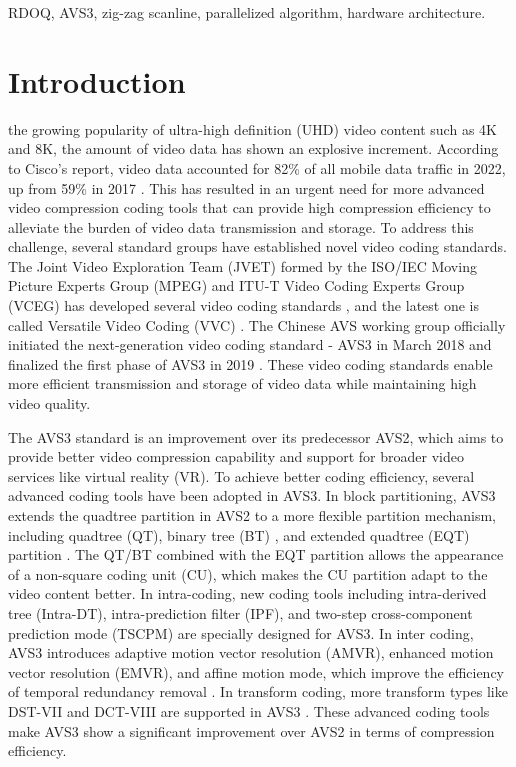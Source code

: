 \documentclass[lettersize,journal]{IEEEtran}
\begin{document}
\begin{IEEEkeywords}
	RDOQ, AVS3, zig-zag scanline, parallelized algorithm, hardware architecture.
\end{IEEEkeywords}

\section{Introduction}
\label{sec:1}
 the growing popularity of ultra-high definition (UHD) video content such as 4K and 8K, the amount of video data has shown an explosive increment. According to Cisco's report, video data accounted for 82\% of all mobile data traffic in 2022, up from 59\% in 2017 \cite{barnett2018cisco}. This has resulted in an urgent need for more advanced video compression coding tools that can provide high compression efficiency to alleviate the burden of video data transmission and storage. To address this challenge, several standard groups have established novel video coding standards. The Joint Video Exploration Team (JVET) formed by the ISO/IEC Moving Picture Experts Group (MPEG) and ITU-T Video Coding Experts Group (VCEG) has developed several video coding standards \cite{1994H.262/MPEG-2, avcoverview, sullivan2012hevcoverview}, and the latest one is called Versatile Video Coding (VVC) \cite{bross2021vvcoverview}. The Chinese AVS working group officially initiated the next-generation video coding standard - AVS3 in March 2018 and finalized the first phase of AVS3 in 2019 \cite{zhang2019avs3overview}. These video coding standards enable more efficient transmission and storage of video data while maintaining high video quality. 

The AVS3 standard is an improvement over its predecessor AVS2, which aims to provide better video compression capability and support for broader video services like virtual reality (VR). To achieve better coding efficiency, several advanced coding tools have been adopted in AVS3. In block partitioning, AVS3 extends the quadtree partition in AVS2 to a more flexible partition mechanism, including quadtree (QT), binary tree (BT) \cite{huang2019vvcbt}, and extended quadtree (EQT) partition \cite{wang2019extendedpartition}. The QT/BT combined with the EQT partition allows the appearance of a non-square coding unit (CU), which makes the CU partition adapt to the video content better. In intra-coding, new coding tools including intra-derived tree (Intra-DT), intra-prediction filter (IPF), and two-step cross-component prediction mode (TSCPM) are specially designed for AVS3. In inter coding, AVS3 introduces adaptive motion vector resolution (AMVR), enhanced motion vector resolution (EMVR), and affine motion mode, which improve the efficiency of temporal redundancy removal \cite{fan2020avs3codingtools}. In transform coding, more transform types like DST-VII and DCT-VIII are supported in AVS3 \cite{avs3standard}. These advanced coding tools make AVS3 show a significant improvement over AVS2 in terms of compression efficiency. 
\end{document}
